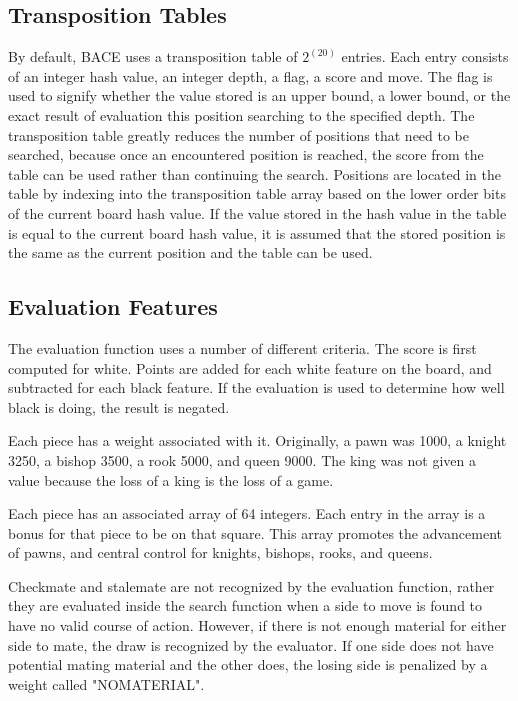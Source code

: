 \documentclass{article}
\begin{document}
\subsection{Transposition Tables}

By default, BACE uses a transposition table of $2^(20)$ entries.  Each
entry consists of an integer hash value, an integer depth, a flag, a
score and move.  The flag is used to signify whether the value stored
is an upper bound, a lower bound, or the exact result of evaluation
this position searching to the specified depth.  The transposition
table greatly reduces the number of positions that need to be
searched, because once an encountered position is reached, the score
from the table can be used rather than continuing the search.
Positions are located in the table by indexing into the transposition
table array based on the lower order bits of the current board hash
value.  If the value stored in the hash value in the table is equal to
the current board hash value, it is assumed that the stored position
is the same as the current position and the table can be used.

\subsection{Evaluation Features}

The evaluation function uses a number of different criteria.  The
score is first computed for white.  Points are added for each white
feature on the board, and subtracted for each black feature.  If the
evaluation is used to determine how well black is doing, the result is
negated.

Each piece has a weight associated with it.  Originally, a pawn was
1000, a knight 3250, a bishop 3500, a rook 5000, and queen 9000.  The
king was not given a value because the loss of a king is the loss of a
game.

Each piece has an associated array of 64 integers.  Each entry in the
array is a bonus for that piece to be on that square.  This array
promotes the advancement of pawns, and central control for knights,
bishops, rooks, and queens.

Checkmate and stalemate are not recognized by the evaluation function,
rather they are evaluated inside the search function when a side to
move is found to have no valid course of action.  However, if there is
not enough material for either side to mate, the draw is recognized by
the evaluator.  If one side does not have potential mating material
and the other does, the losing side is penalized by a weight called
"NOMATERIAL".
\end{document}
